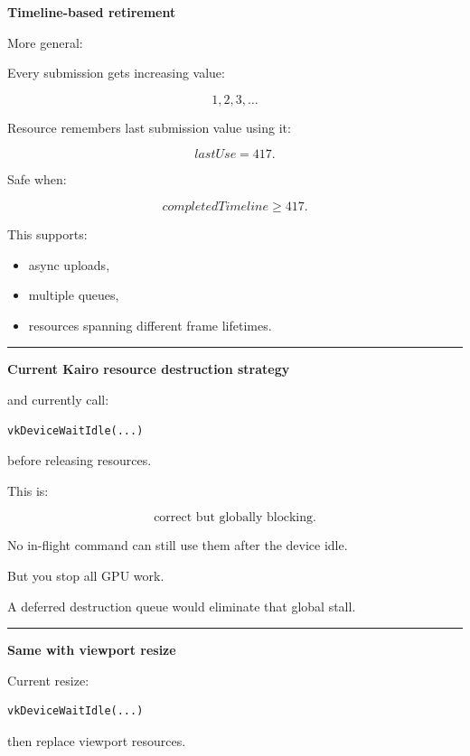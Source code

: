 \textbf{Timeline-based retirement}

More general:

Every submission gets increasing value:

\[
1,2,3,\dots
\]

Resource remembers last submission value using it:

\[
lastUse=417.
\]

Safe when:

\[
completedTimeline\ge417.
\]

This supports:

\begin{itemize}
\tightlist
\item
  async uploads,
\item
  multiple queues,
\item
  resources spanning different frame lifetimes.
\end{itemize}

\begin{center}\rule{0.5\linewidth}{0.5pt}\end{center}

\textbf{Current Kairo resource destruction strategy}

 and  currently call:

\begin{verbatim}
vkDeviceWaitIdle(...)
\end{verbatim}

before releasing resources.

This is:

\[
\boxed{\text{correct but globally blocking}.}
\]

No in-flight command can still use them after the device idle.

But you stop all GPU work.

A deferred destruction queue would eliminate that global stall.

\begin{center}\rule{0.5\linewidth}{0.5pt}\end{center}

\textbf{Same with viewport resize}

Current resize:

\begin{verbatim}
vkDeviceWaitIdle(...)
\end{verbatim}

then replace viewport resources.

